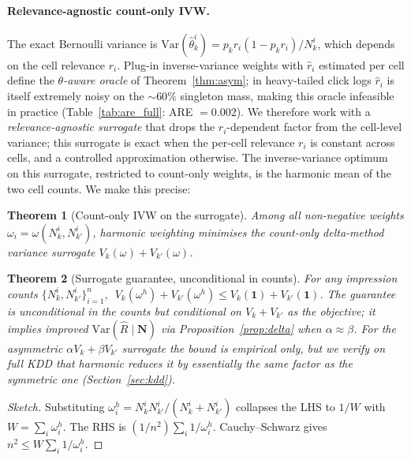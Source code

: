 \documentclass[sigconf]{acmart}
\newtheorem{theorem}{Theorem}
\begin{document}
\paragraph{Relevance-agnostic count-only IVW.}
The exact Bernoulli variance is
$\mathrm{Var}(\hat\theta_k^i)=p_kr_i(1-p_kr_i)/N_k^i$, which depends on
the cell relevance $r_i$. Plug-in inverse-variance weights with
$\hat r_i$ estimated per cell define the
\emph{$\theta$-aware oracle} of Theorem~\ref{thm:asym}; in
heavy-tailed click logs $\hat r_i$ is itself extremely noisy on the
$\sim\!60\%$ singleton mass, making this oracle infeasible in practice
(Table~\ref{tab:are_full}: ARE $= 0.002$). We therefore work with a
\emph{relevance-agnostic surrogate} that drops the $r_i$-dependent
factor from the cell-level variance; this surrogate is exact when the
per-cell relevance $r_i$ is constant across cells, and a controlled
approximation otherwise. The inverse-variance
optimum~\cite{borenstein2009meta} on this surrogate, restricted to
count-only weights, is the harmonic mean of the two cell counts. We make this
precise:

\begin{theorem}[Count-only IVW on the surrogate]
\label{thm:ivw}
Among all non-negative weights $\omega_i=\omega(N_k^i,N_{k'}^i)$, harmonic
weighting minimises the count-only delta-method variance surrogate
$V_k(\omega)+V_{k'}(\omega)$.
\end{theorem}

\begin{theorem}[Surrogate guarantee, unconditional in counts]
\label{thm:cs}
For any impression counts $\{N_k^i,N_{k'}^i\}_{i=1}^n$,
$\;V_k(\omega^h)+V_{k'}(\omega^h)\le V_k(\mathbf 1)+V_{k'}(\mathbf 1)$.
The guarantee is unconditional in the counts but conditional on
$V_k+V_{k'}$ as the objective; it implies improved
$\mathrm{Var}(\hat R\mid\mathbf N)$ via
Proposition~\ref{prop:delta} when $\alpha\approx\beta$. For the
asymmetric $\alpha V_k+\beta V_{k'}$ surrogate the bound is empirical
only, but we verify on full KDD that harmonic reduces it by essentially
the same factor as the symmetric one (Section~\ref{sec:kdd}).
\end{theorem}

\begin{proof}[Sketch]
Substituting $\omega_i^h=N_k^i N_{k'}^i/(N_k^i+N_{k'}^i)$ collapses the LHS to
$1/W$ with $W=\sum_i\omega_i^h$. The RHS is
$(1/n^2)\sum_i 1/\omega_i^h$. Cauchy--Schwarz gives
$n^2\le W\sum_i 1/\omega_i^h$.
\end{proof}
\end{document}
